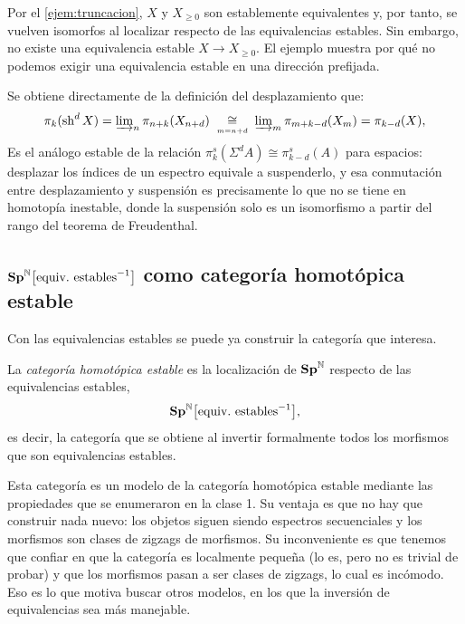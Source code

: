Por el \cref{ejem:truncacion}, $X$ y $X_{\ge0}$ son establemente equivalentes y, por tanto, se vuelven isomorfos al localizar respecto de las equivalencias estables. Sin embargo, no existe una equivalencia estable $X\to X_{\ge0}$. El ejemplo muestra por qué no podemos exigir una equivalencia estable en una dirección prefijada.

\begin{nota}
Se obtiene directamente de la definición del desplazamiento que:
\[\textstyle
\pi_k(\operatorname{sh}^dX) = \varinjlim\nolimits_n\pi_{n+k}(X_{n+d})
\;\underset{\scriptscriptstyle m=n+d}{\cong}\;
\varinjlim\nolimits_{m}\pi_{m+k-d}(X_{m}) = \pi_{k-d}(X),
\]
Es el análogo estable de la relación $\pi^s_{k}(\Sigma^dA)\cong\pi^s_{k-d}(A)$ para espacios: desplazar los índices de un espectro equivale a suspenderlo, y esa conmutación entre desplazamiento y suspensión es precisamente lo que no se tiene en homotopía inestable, donde la suspensión solo es un isomorfismo a partir del rango del teorema de Freudenthal.
\end{nota}

\subsection{%
    \texorpdfstring{$\Sp^{\mathbb{N}}\bigl[\text{equiv.\ estables}^{-1}\bigr]$}{Sp[1/equiv. estables]} como categoría homotópica estable%
}

Con las equivalencias estables se puede ya construir la categoría que interesa.

\begin{defi}\label{defi:categoria-estable}
La \emph{categoría homotópica estable} es la localización de $\mathbf{Sp}^{\mathbb{N}}$ respecto de las equivalencias estables,
\[
\Sp^{\mathbb{N}}\bigl[\text{equiv.\ estables}^{-1}\bigr],
\]
es decir, la categoría que se obtiene al invertir formalmente todos los morfismos que son equivalencias estables.
\end{defi}

Esta categoría es un modelo de la categoría homotópica estable mediante las propiedades que se enumeraron en la clase 1. Su ventaja es que no hay que construir nada nuevo: los objetos siguen siendo espectros secuenciales y los morfismos son clases de zigzags de morfismos. Su inconveniente es que tenemos que confiar en que la categoría es localmente pequeña (lo es, pero no es trivial de probar) y que los morfismos pasan a ser clases de zigzags, lo cual es incómodo. Eso es lo que motiva buscar otros modelos, en los que la inversión de equivalencias sea más manejable.

